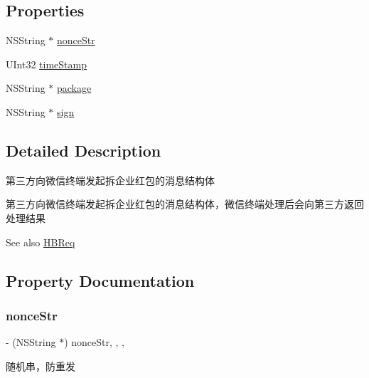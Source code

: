 \subsection*{Properties}
\begin{DoxyCompactItemize}
\item 
N\+S\+String $\ast$ \mbox{\hyperlink{interface_h_b_req_a281154c25f083fb1ae88de03f5d63a62}{nonce\+Str}}
\item 
U\+Int32 \mbox{\hyperlink{interface_h_b_req_aafcc0456aab227fa1b3e379a1419c878}{time\+Stamp}}
\item 
N\+S\+String $\ast$ \mbox{\hyperlink{interface_h_b_req_a0a2cdc7e84f8d80f421636c266b78eae}{package}}
\item 
N\+S\+String $\ast$ \mbox{\hyperlink{interface_h_b_req_aa7fe9c560352d6419a38005069e1a404}{sign}}
\end{DoxyCompactItemize}


\subsection{Detailed Description}
第三方向微信终端发起拆企业红包的消息结构体 

第三方向微信终端发起拆企业红包的消息结构体，微信终端处理后会向第三方返回处理结果 \begin{DoxySeeAlso}{See also}
\mbox{\hyperlink{interface_h_b_req}{H\+B\+Req}} 
\end{DoxySeeAlso}


\subsection{Property Documentation}
\mbox{\label{interface_h_b_req_a281154c25f083fb1ae88de03f5d63a62}} 
\subsubsection{\texorpdfstring{nonce\+Str}{nonceStr}}
{\footnotesize\ttfamily -\/ (N\+S\+String $\ast$) nonce\+Str\hspace{0.3cm}{\ttfamily [read]}, {\ttfamily [write]}, {\ttfamily [nonatomic]}, {\ttfamily [retain]}}

随机串，防重发 \mbox{\label{interface_h_b_req_a0a2cdc7e84f8d80f421636c266b78eae}} 
